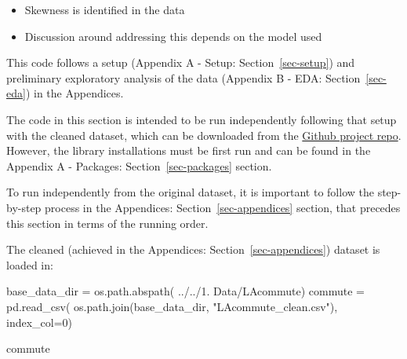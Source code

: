 \documentclass[
  number]{elsarticle}
\newenvironment{Shaded}{\begin{snugshade}}{\end{snugshade}}
\newcommand{\DecValTok}[1]{\textcolor[rgb]{0.68,0.00,0.00}{#1}}
\newcommand{\NormalTok}[1]{\textcolor[rgb]{0.00,0.23,0.31}{#1}}
\newcommand{\OperatorTok}[1]{\textcolor[rgb]{0.37,0.37,0.37}{#1}}
\newcommand{\StringTok}[1]{\textcolor[rgb]{0.13,0.47,0.30}{#1}}
\providecommand{\tightlist}{%
  \setlength{\itemsep}{0pt}\setlength{\parskip}{0pt}}
\begin{document}
\begin{tcolorbox}
\begin{itemize}
  \begin{itemize}
  \tightlist
  \item
    Skewness is identified in the data
  \item
    Discussion around addressing this depends on the model used
  \end{itemize}
\end{itemize}

\end{tcolorbox}

\begin{tcolorbox}[enhanced jigsaw, colframe=quarto-callout-warning-color-frame, opacityback=0, breakable, toptitle=1mm, titlerule=0mm, coltitle=black, colback=white, bottomtitle=1mm, left=2mm, arc=.35mm, leftrule=.75mm, opacitybacktitle=0.6, bottomrule=.15mm, colbacktitle=quarto-callout-warning-color!10!white, title=\textcolor{quarto-callout-warning-color}{\faExclamationTriangle}\hspace{0.5em}{Warning}, rightrule=.15mm, toprule=.15mm]

This code follows a setup (Appendix A - Setup: Section~\ref{sec-setup})
and preliminary exploratory analysis of the data (Appendix B - EDA:
Section~\ref{sec-eda}) in the Appendices.

The code in this section is intended to be run independently following
that setup with the cleaned dataset, which can be downloaded from the
\href{https://github.com/2601547/commute}{Github project repo}. However,
the library installations must be first run and can be found in the
Appendix A - Packages: Section~\ref{sec-packages} section.

To run independently from the original dataset, it is important to
follow the step-by-step process in the Appendices:
Section~\ref{sec-appendices} section, that precedes this section in
terms of the running order.

\end{tcolorbox}

The cleaned (achieved in the Appendices: Section~\ref{sec-appendices})
dataset is loaded in:

\begin{Shaded}
\begin{Highlighting}[]
\NormalTok{base\_data\_dir }\OperatorTok{=}\NormalTok{ os.path.abspath(}
    \StringTok{\textquotesingle{}../../1. Data/LAcommute\textquotesingle{}}\NormalTok{)}
\NormalTok{commute }\OperatorTok{=}\NormalTok{ pd.read\_csv(}
\NormalTok{    os.path.join(base\_data\_dir, }\StringTok{"LAcommute\_clean.csv"}\NormalTok{), index\_col}\OperatorTok{=}\DecValTok{0}\NormalTok{)}

\NormalTok{commute}
\end{Highlighting}
\end{Shaded}
\end{document}
